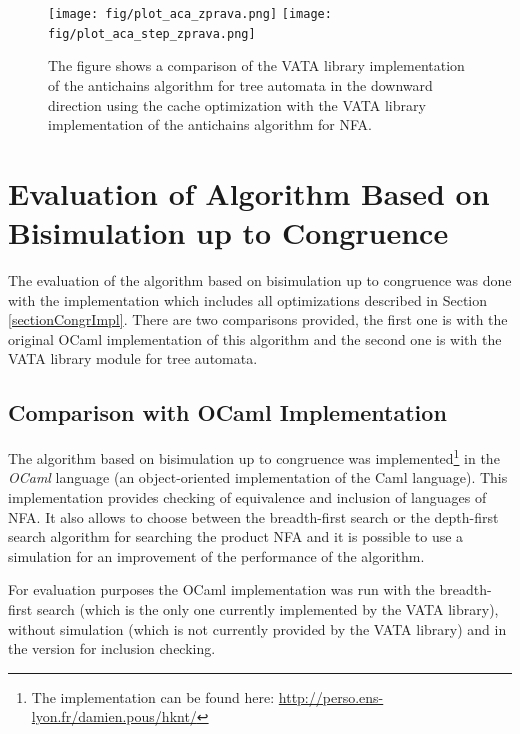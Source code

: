 \begin{figure}[bt]
\begin{center}
\texttt{[image: fig/plot\_aca\_zprava.png]}
\texttt{[image: fig/plot\_aca\_step\_zprava.png]}
\caption{The figure shows
 a comparison of the VATA library implementation of the antichains algorithm for tree automata in the downward direction using the cache optimization 
 with the VATA library implementation of the antichains algorithm for NFA.}
\label{fig:figPlotAca}
\end{center}
\end{figure}

\section{Evaluation of Algorithm Based on Bisimulation up to Congruence}
The evaluation of the algorithm based on bisimulation up to congruence was done with the implementation which includes all optimizations described in Section 
\ref{sectionCongrImpl}. There are two comparisons provided, the first one is with the original OCaml implementation of this algorithm \cite{popl13} 
and the second one is with the VATA library module for tree automata.

\subsection{Comparison with OCaml Implementation}
The algorithm based on bisimulation up to congruence was implemented\footnote{The implementation can be found here: \url{
http://perso.ens-lyon.fr/damien.pous/hknt/}} 
in the \emph{OCaml} language (an object-oriented implementation of the Caml language). 
This implementation provides checking of equivalence
and inclusion of languages of NFA. It also allows to choose between the breadth-first search or the depth-first search algorithm for searching the
product NFA and it is possible to use a simulation for an improvement of the performance of the algorithm.

For evaluation purposes the OCaml implementation was run with the breadth-first search (which is the only one currently implemented by the VATA library), without
simulation (which is not currently provided by the VATA library) and in the version for inclusion checking.

